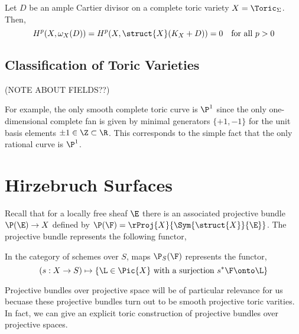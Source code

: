 \begin{theorem}
Let $D$ be an ample Cartier divisor on a complete toric variety $X = \Toric_\Sigma$. Then,
\[ H^p(X, \omega_X(D)) = H^p(X, \struct{X}(K_X + D)) = 0 \quad \text{for all } p > 0 \]
\end{theorem}


\subsection{Classification of Toric Varieties}

(NOTE ABOUT FIELDS??)

\begin{rmk}
For example, the only smooth complete toric curve is $\P^1$ since the only one-dimensional complete fan is given by minimal generators $\{ +1 , -1 \}$ for the unit basis elements $\pm 1 \in \Z \subset \R$. This corresponds to the simple fact that the only rational curve is $\P^1$. 
\end{rmk}

\section{Hirzebruch Surfaces}

Recall that for a locally free sheaf $\E$ there is an associated projective bundle $\P(\E) \to X$ defined by $\P(\F) = \rProj{X}{\Sym{\struct{X}}{\E}}$. The projective bundle represents the following functor,

\begin{prop}
In the category of schemes over $S$, maps $\P_S(\F)$ represents the functor,
\[ (s : X \to S) \mapsto \{ \L \in \Pic{X} \text{ with a surjection } s^* \F \onto \L \} \] 
\end{prop}

Projective bundles over projective space will be of particular relevance for us becuase these projective bundles turn out to be smooth projective toric varities. In fact, we can give an explicit toric construction of projective bundles over projective spaces.

